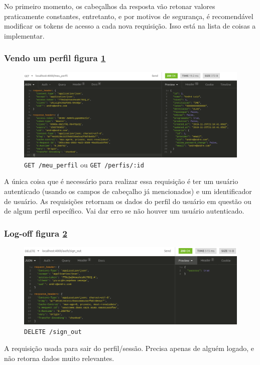 No primeiro momento, os cabeçalhos da resposta vão retonar valores praticamente constantes, entretanto, e por motivos de
segurança, é recomendável modificar os tokens de acesso a cada nova requisição. Isso está na lista de coisas a implementar.

\subsubsection{Vendo um perfil \hfill figura \ref{fig:ver-perfil}}

\begin{figure}[ht]
  \centering
  \includegraphics[width=.75\textwidth]{figuras/ver-perfil.png}
  \caption{\texttt{GET /meu\_perfil} ou \texttt{GET /perfis/:id}}
  \label{fig:ver-perfil}
\end{figure}

A única coisa que é necessário para realizar essa requisição é ter um usuário autenticado (usando os campos de cabeçalho
já mencionados) e um identificador de usuário. As requisições retornam os dados do perfil do usuário em questão ou de
algum perfil específico. Vai dar erro se não houver um usuário autenticado.

\subsubsection{Log-off \hfill figura \ref{fig:saindo}}

\begin{figure}[ht]
  \centering
  \includegraphics[width=.75\textwidth]{figuras/sign-out.png}
  \caption{\texttt{DELETE /sign\_out}}
  \label{fig:saindo}
\end{figure}

A requisição usada para sair do perfil/sessão. Precisa apenas de alguém logado, e não retorna dados muito relevantes.

